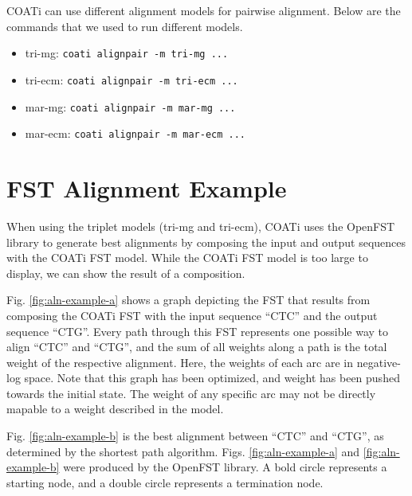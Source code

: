 \documentclass[
]{article}
\providecommand{\tightlist}{%
  \setlength{\itemsep}{0pt}\setlength{\parskip}{0pt}}
\begin{document}
COATi can use different alignment models for pairwise alignment. Below are the
commands that we used to run different models.

\begin{itemize}
\tightlist
\item
  tri-mg: \texttt{coati\ alignpair\ -m\ tri-mg\ ...}
\item
  tri-ecm: \texttt{coati\ alignpair\ -m\ tri-ecm\ ...}
\item
  mar-mg: \texttt{coati\ alignpair\ -m\ mar-mg\ ...}
\item
  mar-ecm: \texttt{coati\ alignpair\ -m\ mar-ecm\ ...}
\end{itemize}

\section{FST Alignment Example}\label{fst-alignment-example}

When using the triplet models (tri-mg and tri-ecm), COATi uses the OpenFST
library to generate best alignments by composing the input and output sequences
with the COATi FST model. While the COATi FST model is too large to display, we
can show the result of a composition.

Fig. \ref{fig:aln-example-a} shows a graph depicting the FST that results from
composing the COATi FST with the input sequence ``CTC'' and the output sequence
``CTG''. Every path through this FST represents one possible way to align ``CTC''
and ``CTG'', and the sum of all weights along a path is the total weight of the
respective alignment. Here, the weights of each arc are in negative-log space.
Note that this graph has been optimized, and weight has been pushed towards the
initial state. The weight of any specific arc may not be directly mapable to a
weight described in the model.

Fig. \ref{fig:aln-example-b} is the best alignment between ``CTC'' and ``CTG'', as
determined by the shortest path algorithm. Figs. \ref{fig:aln-example-a} and
\ref{fig:aln-example-b} were produced by the OpenFST library. A bold circle
represents a starting node, and a double circle represents a termination node.
\end{document}
